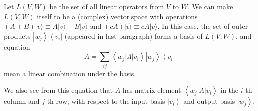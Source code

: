 \documentclass[
	11pt, %
	fleqn, %
	a4paper, %
]{LegrandOrangeBook}
\begin{document}
Let $L(V,W)$ be the set of all linear operators from $V$ to $W$.
We can make $L(V,W)$ itself to be a (complex) vector space with operations $(A +B) |v\rangle \equiv A |v\rangle + B |v\rangle$ and $(c A) |v\rangle \equiv c A |v\rangle$. 
In this case, the set of outer products $\left|w_{j}\right\rangle\left\langle v_{i}\right|$ (appeared in last paragraph) forms a basis of $L(V,W)$, and equation 
$$
A =\sum_{i j}\left\langle w_{j}|A| v_{i}\right\rangle\left|w_{j}\right\rangle\left\langle v_{i}\right|
$$
mean a linear combination under the basis.

We also see from this equation that $A$ has matrix element $\left\langle w_{j}|A| v_{i}\right\rangle$ in the $i$ th column and $j$ th row, with respect to the input basis $\left|v_{i}\right\rangle$ and output basis $\left|w_{j}\right\rangle$.





\end{document}
